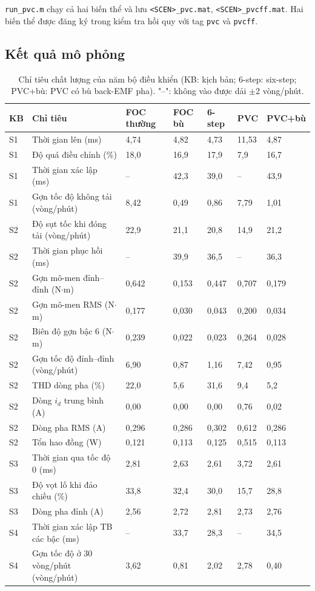 \texttt{run\_pvc.m} chạy cả hai biến thể và lưu \texttt{<SCEN>\_pvc.mat}, \texttt{<SCEN>\_pvcff.mat}. Hai biến thể được đăng ký trong kiểm tra hồi quy với tag \texttt{pvc} và \texttt{pvcff}.

\subsection{Kết quả mô phỏng}\label{sec:9.5}

\begin{table}[H]
\centering\small
\caption{Chỉ tiêu chất lượng của năm bộ điều khiển (KB: kịch bản; 6-step: six-step; PVC+bù: PVC có bù back-EMF pha). "–": không vào được dải $\pm$2 vòng/phút.}\label{tab:9.3}
\begin{tabularx}{\linewidth}{@{}l>{\raggedright\arraybackslash}Xlllll@{}}
\toprule
KB & Chỉ tiêu & FOC thường & FOC bù & 6-step & PVC & PVC+bù \\ \midrule
S1 & Thời gian lên (ms) & 4,74 & 4,82 & 4,73 & 11,53 & 4,87 \\
S1 & Độ quá điều chỉnh (\%) & 18,0 & 16,9 & 17,9 & 7,9 & 16,7 \\
S1 & Thời gian xác lập (ms) & – & 42,3 & 39,0 & – & 43,9 \\
S1 & Gợn tốc độ không tải (vòng/phút) & 8,42 & 0,49 & 0,86 & 7,79 & 1,01 \\
S2 & Độ sụt tốc khi đóng tải (vòng/phút) & 22,9 & 21,1 & 20,8 & 14,9 & 21,2 \\
S2 & Thời gian phục hồi (ms) & – & 39,9 & 36,5 & – & 36,3 \\
S2 & Gợn mô-men đỉnh–đỉnh (N$\cdot$m) & 0,642 & 0,153 & 0,447 & 0,707 & 0,179 \\
S2 & Gợn mô-men RMS (N$\cdot$m) & 0,177 & 0,030 & 0,043 & 0,200 & 0,034 \\
S2 & Biên độ gợn bậc 6 (N$\cdot$m) & 0,239 & 0,022 & 0,023 & 0,264 & 0,028 \\
S2 & Gợn tốc độ đỉnh–đỉnh (vòng/phút) & 6,90 & 0,87 & 1,16 & 7,42 & 0,95 \\
S2 & THD dòng pha (\%) & 22,0 & 5,6 & 31,6 & 9,4 & 5,2 \\
S2 & Dòng $i_d$ trung bình (A) & 0,00 & 0,00 & 0,00 & 0,76 & 0,02 \\
S2 & Dòng pha RMS (A) & 0,296 & 0,286 & 0,302 & 0,612 & 0,286 \\
S2 & Tổn hao đồng (W) & 0,121 & 0,113 & 0,125 & 0,515 & 0,113 \\
S3 & Thời gian qua tốc độ 0 (ms) & 2,81 & 2,63 & 2,61 & 3,72 & 2,61 \\
S3 & Độ vọt lố khi đảo chiều (\%) & 33,8 & 32,4 & 30,0 & 15,7 & 28,8 \\
S3 & Dòng pha đỉnh (A) & 2,56 & 2,72 & 2,81 & 2,73 & 2,76 \\
S4 & Thời gian xác lập TB các bậc (ms) & – & 33,7 & 28,3 & – & 34,5 \\
S4 & Gợn tốc độ ở 30 vòng/phút (vòng/phút) & 3,62 & 0,81 & 2,02 & 2,78 & 0,40 \\
\bottomrule
\end{tabularx}
\end{table}

